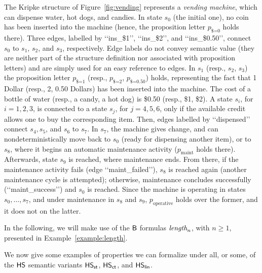 The Kripke structure of Figure~\ref{fig:vending} represents a \emph{vending machine}, which can dispense water, hot dogs, and candies.
In state $s_0$ (the initial one), no coin has been inserted into the machine (hence, the proposition letter $p_\text{\$=0}$ holds there).
Three edges, labelled by \lq\lq ins\_\$1\rq\rq, \lq\lq ins\_\$2\rq\rq, and \lq\lq ins\_\$0.50\rq\rq{}, connect $s_0$ to $s_1$, $s_2$, and $s_3$, respectively. 
Edge labels do not convey semantic value (they are neither part of the structure definition nor associated with proposition letters) and are simply used for an easy reference to edges. 
In $s_1$ (resp., $s_2$, $s_3$) the proposition letter $p_\text{\$=1}$ (resp., $p_\text{\$=2}$, $p_\text{\$=0.50}$) holds, representing the fact that 1 Dollar (resp., 2, 0.50 Dollars) has been inserted into the machine.
The cost of a bottle of water (resp., a candy, a hot dog) is \$0.50 (resp., \$1, \$2). A state $s_i$, for $i=1,2,3$, is connected to a state $s_j$, for $j=4,5,6$, only if the available credit allows one to buy the corresponding item.
Then, edges labelled by \lq\lq dispensed\rq\rq{} connect $s_4,s_5$, and $s_6$ to $s_7$. In $s_7$, the machine gives change, and  can nondeterministically move back to $s_0$ (ready for dispensing another item), or to $s_8$, where it begins an automatic maintenance activity ($p_\text{maint}$ holds there). Afterwards, state $s_9$ is reached, where maintenance ends. From there, if the maintenance activity fails (edge \lq\lq maint\_failed\rq\rq ), $s_8$ is reached again (another maintenance cycle is attempted); otherwise, maintenance concludes successfully (\lq\lq maint\_success\rq\rq ) and $s_0$ is reached. Since the machine is operating in states $s_0,\ldots,s_7$, and under maintenance in $s_8$ and $s_9$, $p_\text{operative}$ holds over the former, and it does not on the latter.

In the following, we will make use of the $\mathsf{B}$ formulas $\textit{length}_{n}$, with $n\geq 1$, presented in Example~\ref{example:length}.

We now give some examples of properties we can formalize under all, or some, of the $\text{\sffamily HS}$ semantic variants $\text{\sffamily HS}_{\mathsf{st}}$, $\text{\sffamily HS}_{\mathsf{ct}}$, and $\text{\sffamily HS}_{\mathsf{lin}}$.

